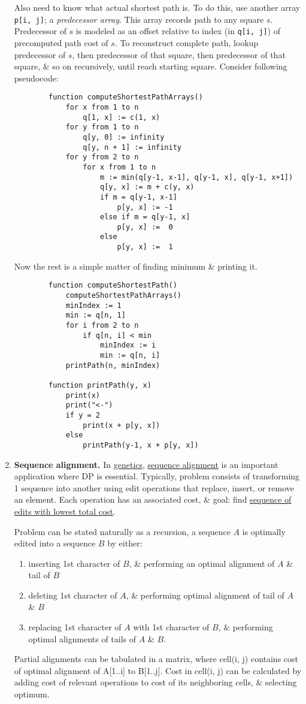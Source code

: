 \documentclass{article}
\begin{document}
\begin{enumerate}
	Also need to know what actual shortest path is. To do this, use another array {\tt p[i, j]}; a {\it predecessor array}. This array records path to any square $s$. Predecessor of $s$ is modeled as an offset relative to index (in {\tt q[i, j]}) of precomputed path cost of $s$. To reconstruct complete path, lookup predecessor of $s$, then predecessor of that square, then predecessor of that square, \& so on recursively, until reach starting square. Consider following pseudocode:
	\begin{verbatim}
		function computeShortestPathArrays()
		    for x from 1 to n
		        q[1, x] := c(1, x)
		    for y from 1 to n
		        q[y, 0] := infinity
		        q[y, n + 1] := infinity
		    for y from 2 to n
		        for x from 1 to n
		            m := min(q[y-1, x-1], q[y-1, x], q[y-1, x+1])
		            q[y, x] := m + c(y, x)
		            if m = q[y-1, x-1]
		                p[y, x] := -1
		            else if m = q[y-1, x]
		                p[y, x] :=  0
		            else
		                p[y, x] :=  1
	\end{verbatim}
	Now the rest is a simple matter of finding minimum \& printing it.
	\begin{verbatim}
		function computeShortestPath()
		    computeShortestPathArrays()
		    minIndex := 1
		    min := q[n, 1]
		    for i from 2 to n
		        if q[n, i] < min
		            minIndex := i
		            min := q[n, i]
		    printPath(n, minIndex)

		function printPath(y, x)
		    print(x)
		    print("<-")
		    if y = 2
		        print(x + p[y, x])
		    else
		        printPath(y-1, x + p[y, x])
	\end{verbatim}
	\item {\bf Sequence alignment.} In \href{https://en.wikipedia.org/wiki/Genetics}{genetics}, \href{https://en.wikipedia.org/wiki/Sequence_alignment}{sequence alignment} is an important application where DP is essential. Typically, problem consists of transforming 1 sequence into another using edit operations that replace, insert, or remove an element. Each operation has an associated cost, \& goal: find \href{https://en.wikipedia.org/wiki/Edit_distance}{sequence of edits with lowest total cost}.

	Problem can be stated naturally as a recursion, a sequence $A$ is optimally edited into a sequence $B$ by either:
	\begin{enumerate}
		\item inserting 1st character of $B$, \& performing an optimal alignment of $A$ \& tail of $B$
		\item deleting 1st character of $A$, \& performing optimal alignment of tail of $A$ \& $B$
		\item replacing 1st character of $A$ with 1st character of $B$, \& performing optimal alignments of tails of $A$ \& $B$.
	\end{enumerate}
	Partial alignments can be tabulated in a matrix, where cell(i, j) contains cost of optimal alignment of A[1..i] to B[1..j]. Cost in cell(i, j) can be calculated by adding cost of relevant operations to cost of its neighboring cells, \& selecting optimum.


\end{enumerate}
\end{document}
